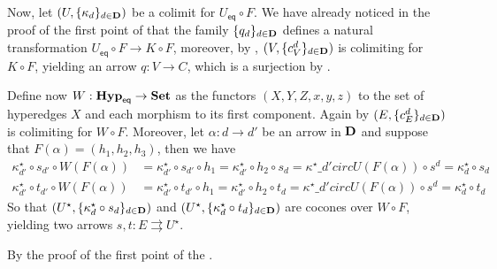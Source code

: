 \documentclass[3p]{elsarticle}
\newcommand{\eq}{\mathsf{eq}}
\newcommand{\Set}{\mathbf{Set}}
\def\D{\textbf {\textup{D}}}
\newcommand{\catname}[1]{\textbf{\textup{#1}}}
\newcommand{\EqHyp}{\catname{Hyp}_{\mathsf{eq}}} %
\theoremstyle{remark}
\theoremstyle{definition}
\begin{document}
{{		
		Now, let $(U, \{\kappa_d\}_{d\in \D})$  be a colimit for $U_\eq\circ F$. We have already noticed in the proof of the first point of  that  the family $\{q_d\}_{d\in \D}$ defines a natural transformation $U_{\eq}\circ F\to K\circ F$, moreover, by , $(V, \{c^d_V\}_{d\in \D})$ is colimiting for  $K\circ F$, yielding an arrow $q: V \to C$, which is a surjection by .
	
	
Define now $W: \EqHyp \to \Set$ as the functors $(X, Y, Z, x, y, z)$ to the set of hyperedges $X$ and each morphism to its first component. Again by  $(E, \{c^d_E\}_{d\in \D})$ is colimiting for $W \circ F$. Moreover, let $\alpha\colon d\to d'$  be an arrow in $\D$ and suppose that $F(\alpha)=(h_1, h_2, h_3)$, then we have
\begin{align*}
	\kappa^\star_{d'}\circ s_{d'} \circ W(F(\alpha))&= \kappa^\star_{d'}\circ s_{d'} \circ h_1= \kappa^\star_{d'}\circ h_2\circ s_{d}=\kappa^\star\_{d'}circ U(F(\alpha))\circ s^d =\kappa^\star_d\circ s_d
	\\\kappa^\star_{d'}\circ t_{d'} \circ W(F(\alpha))&= \kappa^\star_{d'}\circ t_{d'} \circ h_1= \kappa^\star_{d'}\circ h_2\circ t_{d}=\kappa^\star\_{d'}circ U(F(\alpha))\circ s^d =\kappa^\star_d\circ t_d
\end{align*}
So that $(U^\star, \{\kappa^\star_d\circ s_d\}_{d\in \D})$ and $(U^\star, \{\kappa^\star_d\circ t_d\}_{d\in \D})$ are cocones over $W\circ F$, yielding two arrows $s, t\colon E\rightrightarrows U^\star$.

By the proof of the first point of  the . \qedhere }
}


\pbm*
\end{document}
